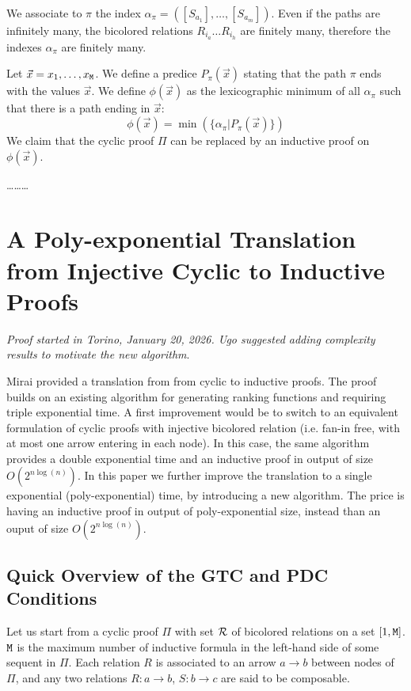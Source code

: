 \documentclass{lmcs}
\begin{document}
We associate to $\pi$ the index $\alpha_\pi = ([S_{a_1}], \ldots, [S_{a_m}])$. 
Even if the paths are infinitely many,
the bicolored relations $R_{i_a} \ldots  R_{i_h}$ are finitely many, therefore the
indexes $\alpha_\pi$ are finitely many.

Let $\vec{x} = x_1, \ldots, x_{{\tt M}}$.
We define a predice $P_\pi(\vec{x})$ stating that the path $\pi$ ends with the
values $\vec{x}$. We define 
$\phi(\vec{x})$ as the lexicographic minimum  
of all $\alpha_\pi$ such that there is a path ending in $\vec{x}$:
$$
\phi(\vec{x}) 
= 
\min(\{\alpha_\pi | P_\pi(\vec{x})\})
$$ 
We claim that the cyclic proof $\Pi$ can be replaced by an inductive proof on $\phi(\vec{x})$.

\ldots\ldots\ldots


\newpage

\section{A Poly-exponential Translation from Injective Cyclic to Inductive Proofs}
\emph{Proof started in Torino, January 20, 2026. 
Ugo suggested adding complexity results to motivate the new algorithm}.

Mirai \cite{Mirai} provided a translation from from cyclic to inductive proofs. The proof builds
on an existing algorithm for generating ranking functions and 
requiring triple exponential time. A first improvement would be to switch to an equivalent
formulation of cyclic proofs with injective bicolored relation (i.e. fan-in free, with at most one
arrow entering in each node). In this case, the same algorithm provides a double exponential
time \cite{} and an inductive proof in output of size $O(2^{n \log(n)})$.
In this paper we further improve the translation to a single exponential (poly-exponential) time, 
by introducing a new algorithm. The price is having an inductive proof in output
of poly-exponential size, instead than an ouput of size $O(2^{n \log(n)})$.


\subsection{Quick Overview of the GTC and PDC Conditions}
Let us start from a cyclic proof $\Pi$ with set ${\mathcal R}$ of bicolored relations on a set 
$[1,{\tt M}]$. ${\tt M}$ is the maximum number of inductive formula in the left-hand side 
of some sequent in $\Pi$. Each relation $R$ is associated to an arrow $a \rightarrow b$ 
between nodes of $\Pi$, and any two relations $R:a \rightarrow b$, $S:b \rightarrow c$
are said to be composable.
 
\end{document}

